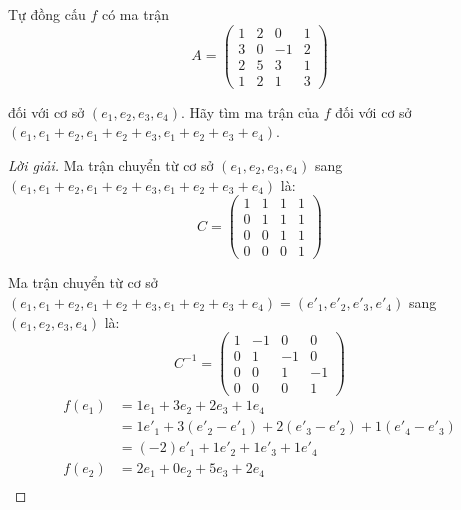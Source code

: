 \documentclass[class=linearalgebra,crop=false]{standalone}
\begin{document}
\begin{exercise}
    Tự đồng cấu $f$ có ma trận
    \[
        A =
        \begin{pmatrix}
            1 & 2 & 0  & 1 \\
            3 & 0 & -1 & 2 \\
            2 & 5 & 3  & 1 \\
            1 & 2 & 1  & 3
        \end{pmatrix}
    \]
    \par đối với cơ sở $(e_{1}, e_{2}, e_{3}, e_{4})$. Hãy tìm ma trận của $f$ đối với cơ sở $(e_{1}, e_{1} + e_{2}, e_{1} + e_{2} + e_{3}, e_{1} + e_{2} + e_{3} + e_{4})$.
\end{exercise}

\begin{proof}[Lời giải]
    Ma trận chuyển từ cơ sở $(e_{1}, e_{2}, e_{3}, e_{4})$ sang $(e_{1}, e_{1} + e_{2}, e_{1} + e_{2} + e_{3}, e_{1} + e_{2} + e_{3} + e_{4})$ là:
    \[
        C =
        \begin{pmatrix}
            1 & 1 & 1 & 1 \\
            0 & 1 & 1 & 1 \\
            0 & 0 & 1 & 1 \\
            0 & 0 & 0 & 1
        \end{pmatrix}
    \]
    \par Ma trận chuyển từ cơ sở $(e_{1}, e_{1} + e_{2}, e_{1} + e_{2} + e_{3}, e_{1} + e_{2} + e_{3} + e_{4}) = (e'_{1}, e'_{2}, e'_{3}, e'_{4})$ sang $(e_{1}, e_{2}, e_{3}, e_{4})$ là:
    \[
        C^{-1} =
        \begin{pmatrix}
            1 & -1 & 0  & 0  \\
            0 & 1  & -1 & 0  \\
            0 & 0  & 1  & -1 \\
            0 & 0  & 0  & 1
        \end{pmatrix}
    \]
    \begin{align*}
        f(e_{1}) & = 1e_{1} + 3e_{2} + 2e_{3} + 1e_{4}                                         \\
                 & = 1e'_{1} + 3(e'_{2} - e'_{1}) + 2(e'_{3} - e'_{2}) + 1(e'_{4} - e'_{3})    \\
                 & = (-2)e'_{1} + 1e'_{2} + 1e'_{3} + 1e'_{4}                                  \\
        f(e_{2}) & = 2e_{1} + 0e_{2} + 5e_{3} + 2e_{4}                                         \\

\end{align*}
\end{proof}
\end{document}
